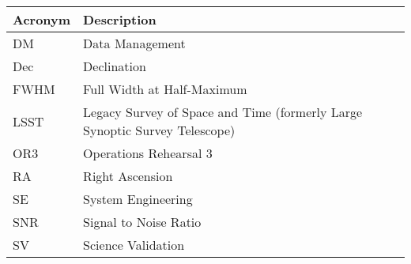 \addtocounter{table}{-1}
\begin{longtable}{p{}p{}}\hline
\textbf{Acronym} & \textbf{Description}  \\\hline

DM & Data Management \\\hline
Dec & Declination \\\hline
FWHM & Full Width at Half-Maximum \\\hline
LSST & Legacy Survey of Space and Time (formerly Large Synoptic Survey Telescope) \\\hline
OR3 & Operations Rehearsal 3 \\\hline
RA & Right Ascension \\\hline
SE & System Engineering \\\hline
SNR & Signal to Noise Ratio \\\hline
SV & Science Validation \\\hline
\end{longtable}
